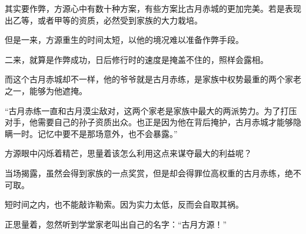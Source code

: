 \begin{this_body}
其实要作弊，方源心中有数十种方案，有些方案比古月赤城的更加完美。若是表现出乙等，或者甲等的资质，必然受到家族的大力栽培。

但是一来，方源重生的时间太短，以他的境况难以准备作弊手段。

二来，就算是作弊成功，日后修行时的速度是掩盖不住的，照样会露相。

而这个古月赤城却不一样，他的爷爷就是古月赤练，是家族中权势最重的两个家老之一，能够为他遮掩。

“古月赤练一直和古月漠尘敌对，这两个家老是家族中最大的两派势力。为了打压对手，他需要自己的孙子资质出众。也正是因为他在背后掩护，古月赤城才能够隐瞒一时。记忆中要不是那场意外，也不会暴露。”

方源眼中闪烁着精芒，思量着该怎么利用这点来谋夺最大的利益呢？

当场揭露，虽然会得到家族的一点奖赏，但是却会得罪位高权重的古月赤练，绝不可取。

短时间之内，也不能敲诈勒索。因为实力太低，反而会自取其祸。

正思量着，忽然听到学堂家老叫出自己的名字：“古月方源！”

\end{this_body}

